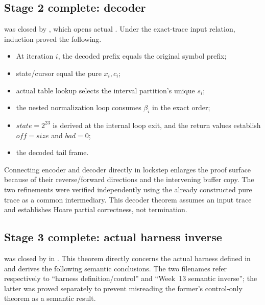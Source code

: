 \subsection{Stage 2 complete: decoder}

 was closed by
, which opens actual
. Under the exact-trace input relation, induction proved
the following.

\begin{itemize}
  \item At iteration \(i\), the decoded prefix equals the original symbol prefix;
  \item state/cursor equal the pure \(x_i,c_i\);
  \item actual table lookup selects the interval partition's unique \(s_i\);
  \item the nested normalization loop consumes \(\beta_i\) in the exact order;
  \item \(state=2^{23}\) is derived at the internal loop exit, and the return
        values establish \(off=size\) and \(bad=0\);
  \item the decoded tail frame.
\end{itemize}

Connecting encoder and decoder directly in lockstep enlarges the proof surface
because of their reverse/forward directions and the intervening buffer copy.
The two refinements were verified independently using the already constructed
pure trace as a common intermediary. This decoder theorem assumes an input
trace and establishes Hoare partial correctness, not termination.

\subsection{Stage 3 complete: actual harness inverse}

 was closed by
 in
. This theorem directly concerns the
actual harness defined in  and derives the
following semantic conclusions. The two filenames refer respectively to
``harness definition/control'' and ``Week~13 semantic inverse''; the latter
was proved separately to prevent misreading the former's control-only theorem
as a semantic result.


